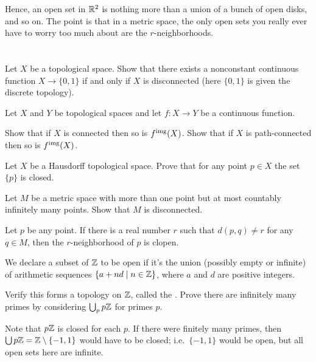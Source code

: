 Hence, an open set in $\mathbb R^2$ is nothing more than a union
of a bunch of open disks, and so on.
The point is that in a metric space, the only open sets you really
ever have to worry too much about are the $r$-neighborhoods.


\section{\problemhead}

\begin{dproblem}
	Let $X$ be a topological space.
	Show that there exists a nonconstant continuous function $X \to \{0,1\}$ if and
	only if $X$ is disconnected (here $\{0,1\}$ is given the discrete topology).
	\label{prob:disconnected_better_def}
\end{dproblem}

\begin{sproblem}
	Let $X$ and $Y$ be topological spaces
	and let $f \colon X \to Y$ be a continuous function.
	\begin{enumerate}[(a)]
		\ii Show that if $X$ is connected then so is $f^{\text{img}}(X)$.
		\ii Show that if $X$ is path-connected then so is $f^{\text{img}}(X)$.
	\end{enumerate}
\end{sproblem}

\begin{problem}
	Let $X$ be a Hausdorff topological space.
	Prove that for any point $p \in X$
	the set $\{p\}$ is closed.
\end{problem}

\begin{problem}
	Let $M$ be a metric space with more than one point
	but at most countably infinitely many points.
	Show that $M$ is disconnected.
	\begin{hint}
		Let $p$ be any point.
		If there is a real number $r$
		such that $d(p,q) \ne r$ for any $q \in M$,
		then the $r$-neighborhood of $p$ is clopen.
	\end{hint}
\end{problem}

\begin{problem}[Furstenberg]
	We declare a subset of $\mathbb Z$ to be open
	if it's the union (possibly empty or infinite)
	of arithmetic sequences $\left\{ a + nd \mid n \in \mathbb Z \right\}$,
	where $a$ and $d$ are positive integers.
	\begin{enumerate}[(a)]
		\ii Verify this forms a topology on $\mathbb Z$,
		called the .
		\ii Prove there are infinitely many primes by considering $\bigcup_p p\mathbb Z$
		for primes $p$.
	\end{enumerate}
	\begin{hint}
		Note that $p\mathbb Z$ is closed for each $p$.
		If there were finitely many primes, then
		$\bigcup p\mathbb Z = \mathbb Z \setminus \{-1,1\}$ would have to be closed;
		i.e.\ $\{-1,1\}$ would be open, but all open sets here are infinite.
	\end{hint}
\end{problem}

